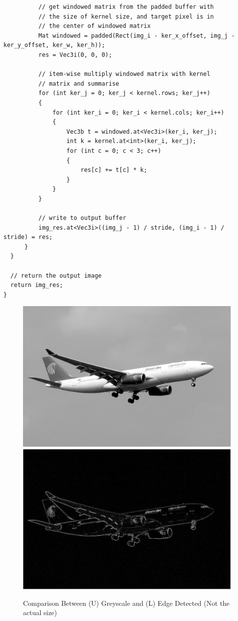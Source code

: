 \documentclass[12pt,a4paper]{report}
\begin{document}
\begin{lstlisting}
          // get windowed matrix from the padded buffer with 
          // the size of kernel size, and target pixel is in
          // the center of windowed matrix
          Mat windowed = padded(Rect(img_i - ker_x_offset, img_j - ker_y_offset, ker_w, ker_h));
          res = Vec3i(0, 0, 0);

          // item-wise multiply windowed matrix with kernel 
          // matrix and summarise 
          for (int ker_j = 0; ker_j < kernel.rows; ker_j++)
          {
              for (int ker_i = 0; ker_i < kernel.cols; ker_i++)
              {
                  Vec3b t = windowed.at<Vec3i>(ker_i, ker_j);
                  int k = kernel.at<int>(ker_i, ker_j);
                  for (int c = 0; c < 3; c++)
                  {
                      res[c] += t[c] * k;
                  }
              }
          }

          // write to output buffer
          img_res.at<Vec3i>((img_j - 1) / stride, (img_i - 1) / stride) = res;
      }
  }

  // return the output image
  return img_res;
}
\end{lstlisting}
\begin{figure}[!htb]
  \centering
  \includegraphics[width=0.9\linewidth]{result_img/aeroplane_Q1.png}
  \includegraphics[width=0.9\linewidth]{result_img/aeroplane_Q2.png}
  \caption{Comparison Between (U) Greyscale and (L) Edge Detected (Not the actual size)}
\end{figure}
\clearpage
\end{document}
